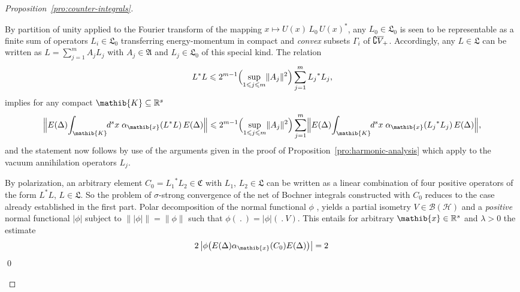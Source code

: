 \documentclass[a4paper,a4paper]{article}
\numberwithin{equation}{section}
\newcommand{\Afrak}{\mathfrak{A}}
\newcommand{\Cfrak}{\mathfrak{C}}
\newcommand{\Lfrak}{\mathfrak{L}}
\newcommand{\Kib}{\mathib{K}}
\newcommand{\xib}{\mathib{x}}
\newcommand{\Rs}{\mathbb{R}^s}
\newcommand{\BH}{\mathscr{B} ( \mathscr{H} )}
\newcommand{\fwcone}{\overline{V}_{\negthinspace +}}
\newcommand{\ED}{E ( \Delta )}
\newcommand{\aibx}{\alpha_\mathib{x}}
\newcounter{proofitem}
\newenvironment{prooflist}{\begin{list}{(\roman{proofitem})}%
  {\usecounter{proofitem} \setlength{\topsep}{0ex}%
   \setlength{\parsep}{0.2ex} \setlength{\itemsep}{0.4ex}%
   \setlength{\leftmargin}{0em} \setlength{\itemindent}{0.5em}%
   \setlength{\listparindent}{1em}}}{\qed \end{list}}
\theoremstyle{definition}
\theoremstyle{plain}
\theoremstyle{remark}
\newcommand{\abs}[1]{\lvert #1 \rvert}
\newcommand{\babs}[1]{\bigl\lvert #1 \bigr\rvert}
\newcommand{\norm}[1]{\lVert #1 \rVert}
\newcommand{\Bnorm}[1]{\Bigl\lVert #1 \Bigr\rVert}
\begin{document}
  \begin{proof}[Proposition~\ref{pro:counter-integrals}]
    \begin{prooflist}
    \item By partition of unity applied to the Fourier transform of
      the mapping $x \mapsto U ( x ) \, L_0 \, U ( x )^*$, any $L_0
      \in \Lfrak_0$ is seen to be representable as a finite sum of
      operators $L_i \in \Lfrak_0$ transferring energy-momentum in
      compact and \emph{convex} subsets $\Gamma_i$ of $\complement
      \fwcone$.  Accordingly, any $L \in \Lfrak$ can be written as $L
      = \sum_{j = 1}^m A_j L_j$ with $A_j \in \Afrak$ and $L_j \in
      \Lfrak_0$ of this special kind. The relation
      \begin{equation*}
        L^* L \leqslant 2^{m - 1} \Bigl( \sup_{1 \leqslant j \leqslant
        m} \norm{A_j}^2 \Bigr) \sum_{j = 1}^m {L_j}^* L_j \text{,}
      \end{equation*}
      implies for any compact $\Kib \subseteq \Rs$
      \begin{equation*}
        \Bnorm{\ED \negthinspace \int_\Kib \negthickspace d^s x \;
        \aibx ( L^* L ) \, \ED} \leqslant 2^{m - 1} \Bigl( \sup_{1
        \leqslant j \leqslant m} \norm{A_j}^2 \Bigr) \sum_{j = 1}^m
        \Bnorm{\ED \negthinspace \int_\Kib \negthickspace d^s x \;
        \aibx ( {L_j}^* L_j ) \, \ED} \text{,}
      \end{equation*}
      and the statement now follows by use of the arguments given in
      the proof of Proposition~\ref{pro:harmonic-analysis} which
      apply to the vacuum annihilation operators $L_j$.
    \item By polarization, an arbitrary element $C_0 = {L_1}^* L_2 \in
      \Cfrak$ with $L_1$, $L_2 \in \Lfrak$ can be written as a linear
      combination of four positive operators of the form $L^* L$, $L
      \in \Lfrak$. So the problem of $\sigma$-strong convergence of
      the net of Bochner integrals constructed with $C_0$ reduces to
      the case already established in the first part. Polar
      decomposition of the normal functional $\phi$
      \cite[Theorem~III.4.2(i), Proposition~III.4.6]{takesaki:1979},
      yields a partial isometry $V \in \BH$ and a \emph{positive}
      normal functional $\abs{\phi}$ subject to $\norm{\abs{\phi}} =
      \norm{\phi}$ such that $\phi(~.~) = \abs{\phi} (~.~V )$. This
      entails for arbitrary $\xib \in \Rs$ and $\lambda > 0$ the
      estimate
      \begin{multline*}
        2 \, \babs{\phi \bigl( \ED \aibx ( C_0 ) \ED \bigr)} = 2 \,

\end{multline*}
\end{prooflist}
\end{proof}
\end{document}
